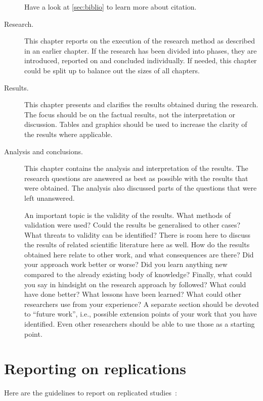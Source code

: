 \documentclass{uvamscse}
\begin{document}
\begin{description}
Have a look at \autoref{sec:biblio} to learn more about citation.
  \item[Research.]
  This chapter reports on the execution of the research method as described in
an earlier chapter. If the research has been divided into phases, they are
introduced, reported on and concluded individually. If needed, this chapter
could be split up to balance out the sizes of all chapters.
  \item[Results.]
  This chapter presents and clarifies the results obtained during the
  research. The focus should be on the factual results, not the interpretation
  or discussion. Tables and graphics should be used to increase the clarity of
  the results where applicable.
  \item[Analysis and conclusions.]
  This chapter contains the analysis and interpretation of the results. The
  research questions are answered as best as possible with the results that
  were obtained. The analysis also discussed parts of the questions that were
  left unanswered.

  An important topic is the validity of the results. What methods of
  validation were used? Could the results be generalised to other cases? What
  threats to validity can be identified? There is room here to discuss the
  results of related scientific literature here as well. How do the results
  obtained here relate to other work, and what consequences are there? Did
  your approach work better or worse? Did you learn anything new compared to
  the already existing body of knowledge? Finally, what could you say in
  hindsight on the research approach by followed? What could have done better?
  What lessons have been learned? What could other researchers use from your
  experience? A separate section should be devoted to ``future work'', i.e.,
  possible extension points of your work that you have identified. Even other
  researchers should be able to use those as a starting point.
\end{description}

\section{Reporting on replications}

Here are the guidelines to report on replicated studies~\cite{Carver10}:
\end{document}
